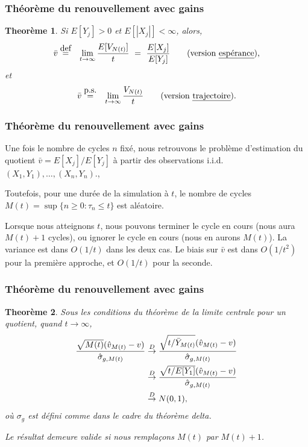 \documentclass[t,usepdftitle=false]{beamer}
\def\eqas{\overset{\mbox{p.s.}}{=}}
\def\iid{i.i.d.}
\def\To{\overset{D}{\to}}
\newtheorem{thm}{Theorème}
\begin{document}
\begin{frame}
\frametitle{Théorème du renouvellement avec gains}

\begin{thm}
Si $E[Y_j] > 0$ et $E[|X_j|] < \infty$, alors,
\begin{eqnarray*}
  \bar v &\overset{\mbox{def}}{=}& \lim_{t\to\infty} {E[V_{N(t)}]\over t}
         ~=~ {E[X_j]\over E[Y_j]}
                \qquad\mbox{(version \emph{espérance}),}
\end{eqnarray*}
et
\begin{eqnarray*}
  \bar v &\eqas& \lim_{t\to\infty} {V_{N(t)}\over t}
                \qquad\mbox{(version \emph{trajectoire})}.
\end{eqnarray*}
\end{thm}

\end{frame}

\begin{frame}
\frametitle{Théorème du renouvellement avec gains}

Une fois le nombre de cycles ${n}$ fixé, nous retrouvons le problème d'estimation du quotient
$\bar v = E[X_j]/ E[Y_j]$ à partir des observations \iid{} $(X_1,Y_1),\dots,(X_n,Y_n)$.,

\mbox{}

Toutefois, pour une durée de la simulation à ${t}$, le nombre de cycles
${M(t)} = \sup\{n \ge 0: \tau_n \le t\}$ est aléatoire.

\mbox{}

Lorsque nous atteignons $t$, nous pouvons terminer le cycle en cours (nous aura $M(t)+1$ cycles), ou
ignorer le cycle en cours (nous en aurons $M(t)$).
La variance est dans $O(1/t)$ dans les deux cas.
Le biais sur $\bar v$ est dans $O(1/t^2)$ pour la première approche, et $O(1/t)$ pour la seconde.

\end{frame}

\begin{frame}
\frametitle{Théorème du renouvellement avec gains}

\begin{thm}
Sous les conditions du théorème de la limite centrale pour un quotient, quand $t\to\infty$, %
\begin{align*}
 {\sqrt{M(t)} (\hat v_{M(t)} - v) \over \hat\sigma_{g,M(t)}} & \To
 {\sqrt{t/\bar Y_{M(t)}} (\hat v_{M(t)} - v) \over \hat\sigma_{g,M(t)}} \\
 &\To {\sqrt{t/E[Y_1]} (\hat v_{M(t)} - v) \over \hat\sigma_{g,M(t)}} \\
  &\To N(0,1),
\end{align*}
où $\sigma_g$ est défini comme dans le cadre du théorème delta.

\mbox{}

Le résultat demeure valide si nous remplaçons $M(t)$ par $M(t)+1$.
\end{thm}

\end{frame}
\end{document}
